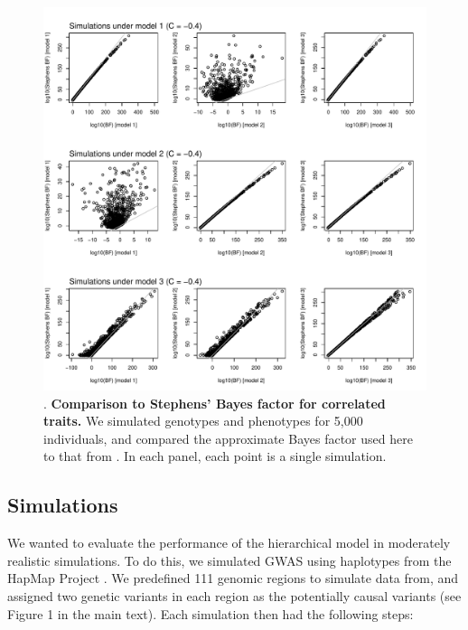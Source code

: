 \documentclass[11pt,titlepage]{article}
\begin{document}
\begin{figure}
\begin{center}
\includegraphics[scale = 0.6]{figs/allc-4.pdf}
\caption{. \textbf{Comparison to Stephens' Bayes factor for correlated traits.} We simulated genotypes and phenotypes for 5,000 individuals, and compared the approximate Bayes factor used here to that from \citet{Stephens:2013fk}. In each panel, each point is a single simulation.}\label{f_c-4}
\end{center}
\end{figure}



\subsection{Simulations}
We wanted to evaluate the performance of the hierarchical model in moderately realistic simulations. To do this, we simulated GWAS using haplotypes from the HapMap Project \citep{Frazer:2007dz}. We predefined 111 genomic regions to simulate data from, and assigned two genetic variants in each region as the potentially causal variants (see Figure 1 in the main text). Each simulation then had the following steps:
\end{document}

